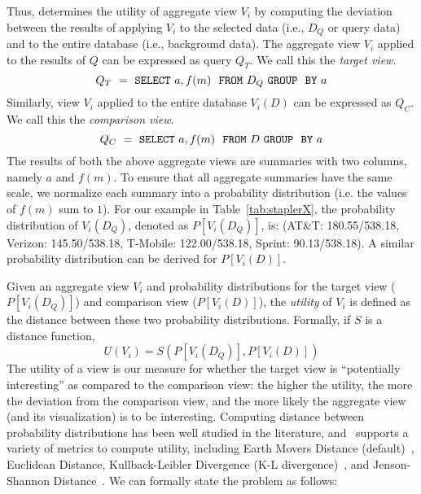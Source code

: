 Thus, \SeeDB determines the utility of aggregate view $V_i$
by computing the deviation between the results of applying $V_i$ to the 
selected data (i.e., $D_Q$ or query data) and to the entire database (i.e., background data).
The aggregate view $V_i$ applied to the results of $Q$ can be expressed as query $Q_T$. 
We call this the {\em target view}.
$$ Q_T\ =\ {\tt SELECT \ } a, f(m) \ \ {\tt FROM} \  D_Q\  {\tt GROUP \ \ BY} \ a$$ 
Similarly, view $V_i$ applied to the entire database $V_i (D)$ can be expressed as $Q_C$. 
We call this the {\em comparison view}. 
$$ Q_C\ =\ {\tt SELECT \ } a, f(m) \ \ {\tt FROM} \  D\  {\tt GROUP \ \ BY} \ a$$
The results of both the above aggregate views are summaries with two columns, namely $a$ and
$f(m)$. 
To ensure that all aggregate summaries have the same scale, we normalize each 
summary into a probability distribution (i.e. the values of $f(m)$ sum to $1$).
For our example in Table~\ref{tab:staplerX}, the probability distribution of
$V_i(D_Q)$, denoted as $P[V_i (D_Q)]$, is: (AT\&T: 180.55/538.18, Verizon:
145.50/538.18, T-Mobile: 122.00/538.18,  Sprint: 90.13/538.18). 
A similar probability distribution can be derived for $P[V_i (D)]$.

Given an aggregate view $V_i$ and probability distributions for the
target view  ($P[V_i (D_Q)]$) and comparison view ($P[V_i (D)]$), the
{\em utility} of $V_i$ is defined as the distance between these two probability
distributions. Formally, if $S$ is a distance function,
$$ U (V_i) = S ( P[V_i (D_Q)], P[V_i (D)] )$$
The utility of a view is our measure for whether the target view is
``potentially interesting'' as compared to the comparison view:
the higher the utility, the more the deviation
from the comparison view, and the more likely the aggregate view (and its visualization) is to be interesting.
Computing distance between probability distributions has
been well studied in the literature, and \SeeDB\ supports a variety of metrics
to compute utility, including Earth Movers Distance (default)~\cite{wikipedia-prob-dist}, 
Euclidean Distance, Kullback-Leibler Divergence (K-L
divergence)~\cite{wikipedia-KL}, and Jenson-Shannon
Distance~\cite{wikipedia-JS,entropy-vis}. 
We can formally state the \SeeDB problem as follows:

